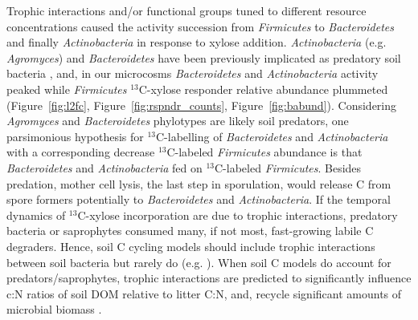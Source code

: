Trophic interactions and/or functional groups tuned to different resource
concentrations caused the activity succession from \textit{Firmicutes} to
\textit{Bacteroidetes} and finally \textit{Actinobacteria} in response to
xylose addition. \textit{Actinobacteria} (e.g. \textit{Agromyces}) and
\textit{Bacteroidetes} have been previously implicated as predatory soil
bacteria \citep{Lueders2006,16346402}, and,  in our microcosms
\textit{Bacteroidetes} and \textit{Actinobacteria} activity peaked  while
\textit{Firmicutes} $^{13}$C-xylose responder relative abundance plummeted
(Figure~\ref{fig:l2fc}, Figure~\ref{fig:rspndr_counts},
Figure~\ref{fig:babund}). Considering \textit{Agromyces} and
\textit{Bacteroidetes} phylotypes are likely soil predators, one parsimonious
hypothesis for $^{13}$C-labelling of \textit{Bacteroidetes} and
\textit{Actinobacteria} with a corresponding decrease $^{13}$C-labeled
\textit{Firmicutes} abundance is that \textit{Bacteroidetes} and
\textit{Actinobacteria} fed on $^{13}$C-labeled \textit{Firmicutes}. Besides
predation, mother cell lysis, the last step in sporulation, would release
C from spore formers potentially to \textit{Bacteroidetes} and
\textit{Actinobacteria}. If the temporal dynamics of $^{13}$C-xylose
incorporation are due to trophic interactions, predatory bacteria or
saprophytes consumed many, if not most, fast-growing labile C degraders. Hence,
soil C cycling models should include trophic interactions between soil bacteria
but rarely do (e.g. \citep{Moore1988}). When soil C models do account for
predators/saprophytes, trophic interactions are predicted to significantly
influence c:N ratios of soil DOM relative to litter C:N, and, recycle 
significant amounts of microbial biomass \citep{Kaiser2014a}.


